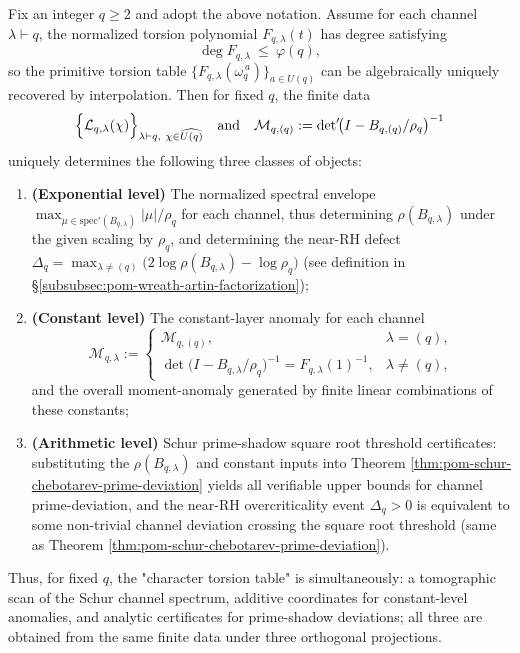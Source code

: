 \begin{theorem}\label{thm:pom-schur-dirichlet-torsion-triple-interface}
Fix an integer \(q\ge2\) and adopt the above notation.
Assume for each channel \(\lambda\vdash q\), the normalized torsion polynomial \(F_{q,\lambda}(t)\) has degree satisfying
\[
\deg F_{q,\lambda}\ \le\ \varphi(q),
\]
so the primitive torsion table \(\{F_{q,\lambda}(\omega_q^{\,a})\}_{a\in U(q)}\) can be algebraically uniquely recovered by interpolation.
Then for fixed \(q\), the finite data
\[
\Bigl\{\mathcal{L}_{q,\lambda}(\chi)\Bigr\}_{\lambda\vdash q,\ \chi\in\widehat{U(q)}}
\quad\text{and}\quad
\mathcal{M}_{q,(q)}:=\det\nolimits'\!\bigl(I-B_{q,(q)}/\rho_q\bigr)^{-1}
\]
uniquely determines the following three classes of objects:
\begin{enumerate}
  \item \textbf{(Exponential level)} The normalized spectral envelope \(\max_{\mu\in\mathrm{spec}'(B_{q,\lambda})}|\mu|/\rho_q\) for each channel, thus determining \(\rho(B_{q,\lambda})\) under the given scaling by \(\rho_q\), and determining the near-RH defect
  \(
  \Delta_q=\max_{\lambda\neq(q)}\bigl(2\log\rho(B_{q,\lambda})-\log\rho_q\bigr)
  \)
  (see definition in \S\ref{subsubsec:pom-wreath-artin-factorization});
  \item \textbf{(Constant level)} The constant-layer anomaly for each channel
  \[
  \mathcal{M}_{q,\lambda}:=
  \begin{cases}
  \mathcal{M}_{q,(q)}, & \lambda=(q),\\[2pt]
  \det\!\bigl(I-B_{q,\lambda}/\rho_q\bigr)^{-1}=F_{q,\lambda}(1)^{-1}, & \lambda\neq(q),
  \end{cases}
  \]
  and the overall moment-anomaly generated by finite linear combinations of these constants;
  \item \textbf{(Arithmetic level)} Schur prime-shadow square root threshold certificates: substituting the \(\rho(B_{q,\lambda})\) and constant inputs into Theorem \ref{thm:pom-schur-chebotarev-prime-deviation} yields all verifiable upper bounds for channel prime-deviation, and the near-RH overcriticality event \(\Delta_q>0\) is equivalent to some non-trivial channel deviation crossing the square root threshold (same as Theorem \ref{thm:pom-schur-chebotarev-prime-deviation}).
\end{enumerate}
Thus, for fixed \(q\), the "character torsion table" is simultaneously: a tomographic scan of the Schur channel spectrum, additive coordinates for constant-level anomalies, and analytic certificates for prime-shadow deviations; all three are obtained from the same finite data under three orthogonal projections.
\end{theorem}
